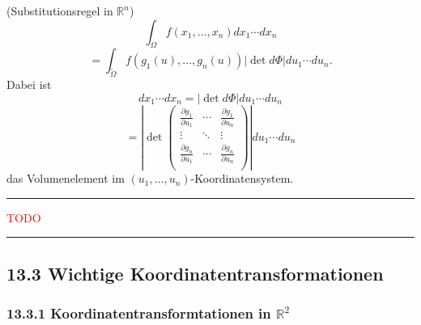 \documentclass[a4paper,landscape,8pt]{extarticle}
\newcommand{\R}{\mathbb{R}}
\newcommand{\abs}[1]{\left\lvert #1 \right\rvert}
\newcommand{\todo}{\textcolor{red}{TODO }}
\newcommand{\sep}{\vspace{5pt}\noindent\hrule\vspace{5pt}}
\begin{document}
\begin{multicols*}{4}
\Satz (Substitutionsregel in $\R^n$)
\[
\int_\Omega f(x_1,\ldots,x_n) dx_1 \cdots dx_n
\]
\[=
\int_{\widetilde{\Omega}} f(g_1(u),\ldots,g_n(u)) \abs{\det{d\Phi}} du_1 \cdots
du_n.
\]
Dabei ist
\[
dx_1 \cdots dx_n = \abs{\det{d\Phi}} du_1 \cdots
du_n
\]
\[=
\abs{\det\begin{pmatrix}
\frac{\partial g_1}{\partial u_1} & \cdots & \frac{\partial g_1}{\partial u_n}\\
\vdots & \ddots & \vdots\\
\frac{\partial g_n}{\partial u_1} & \cdots & \frac{\partial g_n}{\partial u_n}\\
\end{pmatrix}}
 du_1 \cdots du_n
\]
das Volumenelement im $(u_1,\ldots,u_n)$-Koordinatensystem.

\begin{warmup}
\sep

\Bsp \todo

\sep
\end{warmup}

\subsection{13.3 Wichtige Koordinatentransformationen}

\subsubsection{13.3.1 Koordinatentransformtationen in $\R^2$}





\end{multicols*}
\end{document}
